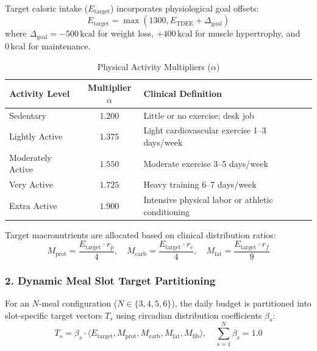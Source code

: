 \documentclass[12pt,a4paper]{report}
\begin{document}
Target caloric intake ($E_{\text{target}}$) incorporates physiological goal offsets:
\begin{equation}
E_{\text{target}} = \max\left(1300, E_{\text{TDEE}} + \Delta_{\text{goal}}\right)
\end{equation}
where $\Delta_{\text{goal}} = -500\,\text{kcal}$ for weight loss, $+400\,\text{kcal}$ for muscle hypertrophy, and $0\,\text{kcal}$ for maintenance.

\begin{table}[htbp]
\centering
\caption{Physical Activity Multipliers ($\alpha$)}
\label{tab:activity_levels}
\begin{tabular}{l c l}
\toprule
\textbf{Activity Level} & \textbf{Multiplier $\alpha$} & \textbf{Clinical Definition} \\
\midrule
Sedentary & $1.200$ & Little or no exercise; desk job \\
Lightly Active & $1.375$ & Light cardiovascular exercise 1--3 days/week \\
Moderately Active & $1.550$ & Moderate exercise 3--5 days/week \\
Very Active & $1.725$ & Heavy training 6--7 days/week \\
Extra Active & $1.900$ & Intensive physical labor or athletic conditioning \\
\bottomrule
\end{tabular}
\end{table}

Target macronutrients are allocated based on clinical distribution ratios:
\begin{equation}
M_{\text{prot}} = \frac{E_{\text{target}} \cdot r_p}{4}, \quad M_{\text{carb}} = \frac{E_{\text{target}} \cdot r_c}{4}, \quad M_{\text{fat}} = \frac{E_{\text{target}} \cdot r_f}{9}
\end{equation}

\subsubsection{2. Dynamic Meal Slot Target Partitioning}
For an $N$-meal configuration ($N \in \{3, 4, 5, 6\}$), the daily budget is partitioned into slot-specific target vectors $T_s$ using circadian distribution coefficients $\beta_s$:
\begin{equation}
T_s = \beta_s \cdot \langle E_{\text{target}}, M_{\text{prot}}, M_{\text{carb}}, M_{\text{fat}}, M_{\text{fib}} \rangle, \quad \sum_{s=1}^{N} \beta_s = 1.0
\end{equation}
\end{document}
